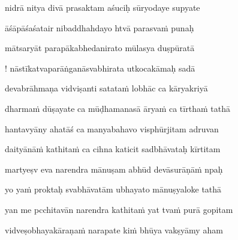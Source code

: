 \ujvers\nemsloka 
nidrā nitya divā prasaktam aśuciḥ sūryodaye supyate
\dontdisplaylinenum

\nemslokab 
āśāpāśaśatair nibaddhahdayo htvā parasva\.m punaḥ \danda\dontdisplaylinenum

\nemslokac 
mātsaryāt parapākabhedanirato mūlasya duṣpūratā
\dontdisplaylinenum

\nemslokad 
! nāstīkatvaparāṅganāsvabhirata utkocakāmaḥ sadā \veg\dontdisplaylinenum

\ujvers\nemsloka 
devabrāhmaṇa vidviṣanti satata\.m lobhāc ca kāryakriyā
\dontdisplaylinenum

\nemslokab 
dharma\.m dūṣayate ca mūḍhamanasā ārya\.m ca tīrtha\.m tathā \danda\dontdisplaylinenum

\nemslokac 
hantavyāny ahatāś ca manyabahavo visphūrjitam adruvan
\dontdisplaylinenum

\nemslokad 
daityānā\.m kathita\.m ca cihna katicit sadbhāvataḥ kīrtitam \veg\dontdisplaylinenum

\ujvers\nemsloka 
martyeṣv eva narendra mānuṣam abhūd devāsurāṇā\.m npaḥ
\dontdisplaylinenum

\nemslokab 
yo ya\.m proktaḥ svabhāvatām ubhayato mānuṣyaloke tathā \danda\dontdisplaylinenum

\nemslokac 
yan me pcchitavān narendra kathita\.m yat tva\.m purā gopitam
\dontdisplaylinenum

\nemslokad 
vidveṣobhayakāraṇa\.m narapate ki\.m bhūya vakṣyāmy aham \veg\dontdisplaylinenum


